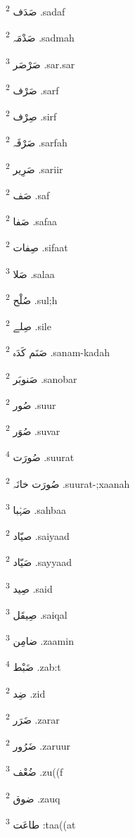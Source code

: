 \documentclass[12pt]{article}
\begin{document}
\begin{multicols}{5}
{\ur صَدَف}   \textsuperscript{2} .sadaf

{\ur صَدْمَہ}   \textsuperscript{2} .sadmah

{\ur صَرْصَر}   \textsuperscript{3} .sar.sar

{\ur صَرْف}   \textsuperscript{2} .sarf

{\ur صِرْف}   \textsuperscript{2} .sirf

{\ur صَرْفَہ}   \textsuperscript{2} .sarfah

{\ur صَرِیر}   \textsuperscript{2} .sariir

{\ur صَف}   \textsuperscript{2} .saf

{\ur صَفا}   \textsuperscript{2} .safaa

{\ur صِفات}   \textsuperscript{2} .sifaat

{\ur صَلا}   \textsuperscript{3} .salaa

{\ur صُلْح}   \textsuperscript{2} .sul;h

{\ur صِلے}   \textsuperscript{2} .sile

{\ur صَنَم کَدَہ}   \textsuperscript{2} .sanam-kadah

{\ur صَنوبَر}   \textsuperscript{2} .sanobar

{\ur صُور}   \textsuperscript{2} .suur

{\ur صُوَر}   \textsuperscript{2} .suvar

{\ur صُورَت}   \textsuperscript{4} .suurat

{\ur صُورَت خانَہ}   \textsuperscript{2} .suurat-;xaanah

{\ur صَہْبا}   \textsuperscript{3} .sahbaa

{\ur صیّاد}   \textsuperscript{2} .saiyaad

{\ur صَیّاد}   \textsuperscript{2} .sayyaad

{\ur صِید}   \textsuperscript{3} .said

{\ur صِیقَل}   \textsuperscript{3} .saiqal

{\ur ضامِن}   \textsuperscript{3} .zaamin

{\ur ضَبْط}   \textsuperscript{4} .zab:t

{\ur ضِد}   \textsuperscript{2} .zid

{\ur ضَرَر}   \textsuperscript{2} .zarar

{\ur ضَرُور}   \textsuperscript{2} .zaruur

{\ur ضُعْف}   \textsuperscript{3} .zu((f

{\ur ضوق}   \textsuperscript{2} .zauq

{\ur طاعَت}   \textsuperscript{3} :taa((at


\end{multicols}
\end{document}
